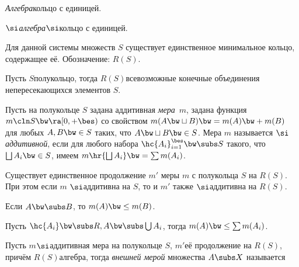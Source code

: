 \documentclass[a4paper,draft]{article}
\begin{document}
\begin{df}
  \emph{Алгебра}\т кольцо с единицей.
\end{df}

\begin{df}
  \emph{$\si$\д алгебра}\т $\si$\д кольцо с единицей.
\end{df}

\begin{theorem}
  Для данной системы множеств $S$ существует единственное минимальное кольцо,
  содержащее её. Обозначение: $R(S)$.
\end{theorem}

\begin{theorem}
  Пусть $S$\т полукольцо, тогда $R(S)$\т всевозможные конечные
  объединения непересекающихся элементов $S$.
\end{theorem}

\begin{df}
  Пусть на полукольце $S$ задана аддитивная \emph{мера}~$m$,  задана функция
  $m\cln S \bw\ra [0,+\bes)$ со свойством $m(A \bw\sqcup B) \bw= m(A) \bw+ m(B)$ для любых
  $A,B \bw\in S$ таких, что $A \bw\sqcup B \bw\in S$.
  Мера $m$ называется \emph{$\si$\д аддитивной}, если для любого набора
  $\hc{A_i}_{i=1}^\bes \bw\subs S$ такого, что $\bigsqcup A_i \bw\in S$, имеем
  $m\hr{\bigsqcup A_i} \bw= \sum m(A_i)$.
\end{df}

\begin{theorem}
  Существует единственное продолжение $m'$ меры $m$ с полукольца $S$ на $R(S)$.
  При этом если $m$ $\si$\д аддитивна на $S$, то
  и $m'$ также $\si$\д аддитивна на $R(S)$.
\end{theorem}

\begin{theorem}
  Если $A \bw\subs B$, то $m(A) \bw\le m(B)$.
\end{theorem}

\begin{theorem}
  Пусть $\hc{A_i} \bw\subs R, A \bw\subs \bigcup A_i$, тогда $m(A) \bw\le \sum m(A_i)$.
\end{theorem}

\begin{df}
  Пусть $m$\т $\si$\д аддитивная мера на полукольце $S$,
  $m'$\т её продолжение на $R(S)$, причём $R(S)$\т алгебра,
  тогда \emph{внешней мерой} множества $A\subs X$ называется
\end{df}
\end{document}
